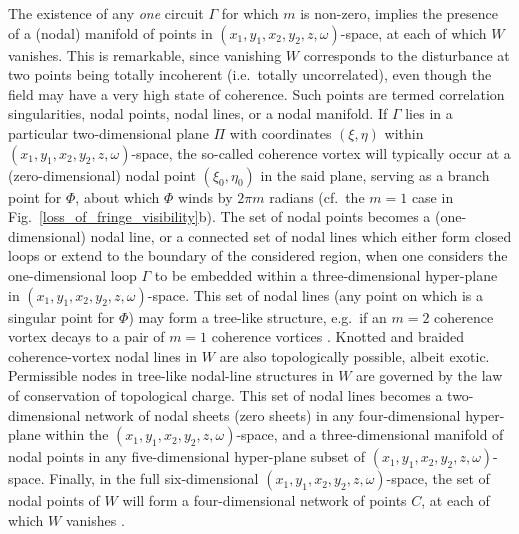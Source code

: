 \documentclass[%
 reprint,
 amsmath,amssymb,
 aps,
]{revtex4-1}
\begin{document}
The existence of any {\em one} circuit $\Gamma$ for which $m$ is non-zero, implies the presence of a (nodal) manifold of points in $(x_1,y_1,x_2,y_2,z,\omega)$-space, at each of which $W$ vanishes.  This is remarkable, since vanishing $W$ corresponds to the disturbance at two points being totally incoherent (i.e.~totally uncorrelated), even though the field may have a very high state of coherence. Such points are termed correlation singularities, nodal points, nodal lines, or a nodal manifold.  If $\Gamma$ lies in a particular two-dimensional plane $\Pi$ with coordinates $(\xi,\eta)$ within $(x_1,y_1,x_2,y_2,z,\omega)$-space, the so-called coherence vortex \cite{GburVisser2003} will typically occur at a (zero-dimensional) nodal point $(\xi_0,\eta_0)$ in the said plane, serving as a branch point for $\Phi$, about which $\Phi$ winds by $2 \pi m$ radians (cf.~the $m=1$ case in Fig.~\ref{loss_of_fringe_visibility}b).  The set of nodal points becomes a (one-dimensional) nodal line, or a connected set of nodal lines which either form closed loops or extend to the boundary of the considered region, when one considers the one-dimensional loop $\Gamma$ to be embedded within a three-dimensional hyper-plane in  $(x_1,y_1,x_2,y_2,z,\omega)$-space.  This set of nodal lines (any point on which is a singular point for $\Phi$) may form a tree-like structure, e.g.~if an $m=2$ coherence vortex decays to a pair of $m=1$ coherence vortices \cite{TopologicalReactionsCohVortices,GburSPIE}.  Knotted and braided coherence-vortex nodal lines in $W$ are also topologically possible, albeit exotic.  Permissible nodes in tree-like nodal-line structures in $W$ are governed by the law of conservation of topological charge.  This set of nodal lines becomes a two-dimensional network of nodal sheets (zero sheets) in any four-dimensional hyper-plane within the $(x_1,y_1,x_2,y_2,z,\omega)$-space, and a three-dimensional manifold of nodal points in any five-dimensional hyper-plane subset of $(x_1,y_1,x_2,y_2,z,\omega)$-space.  Finally, in the full six-dimensional $(x_1,y_1,x_2,y_2,z,\omega)$-space, the set of nodal points of $W$ will form a four-dimensional network of points $C$, at each of which $W$ vanishes \cite{Marasinghe2010}.  
\end{document}

